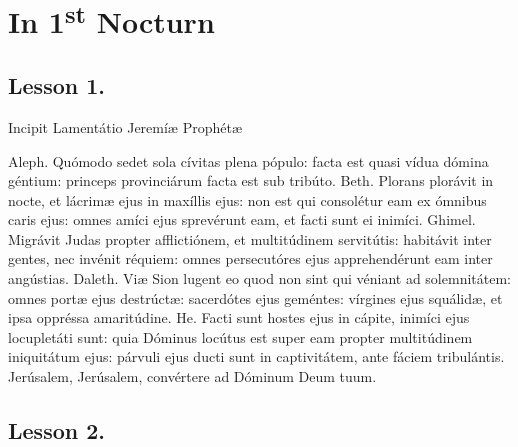 \section*{In 1\textsuperscript{st} Nocturn}




    




    \subsection{Lesson 1.}
    Incipit Lamentátio Jeremíæ Prophétæ


    Aleph. Quómodo sedet sola cívitas plena pópulo: facta est quasi vídua dómina
    géntium: princeps provinciárum facta est sub tribúto. Beth. Plorans plorávit in
    nocte, et lácrimæ ejus in maxíllis ejus: non est qui consolétur eam ex ómnibus
    caris ejus: omnes amíci ejus sprevérunt eam, et facti sunt ei inimíci. Ghimel.
    Migrávit Judas propter afflictiónem, et multitúdinem servitútis: habitávit
    inter gentes, nec invénit réquiem: omnes persecutóres ejus apprehendérunt eam
    inter angústias. Daleth. Viæ Sion lugent eo quod non sint qui véniant ad
    solemnitátem: omnes portæ ejus destrúctæ: sacerdótes ejus geméntes: vírgines
    ejus squálidæ, et ipsa oppréssa amaritúdine. He. Facti sunt hostes ejus in
    cápite, inimíci ejus locupletáti sunt: quia Dóminus locútus est super eam
    propter multitúdinem iniquitátum ejus: párvuli ejus ducti sunt in captivitátem,
    ante fáciem tribulántis. Jerúsalem, Jerúsalem, convértere ad Dóminum Deum tuum.


    \subsection{Lesson 2.}

